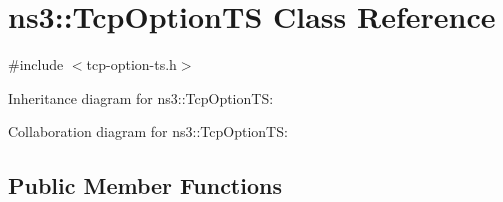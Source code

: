 \hypertarget{classns3_1_1TcpOptionTS}{}\section{ns3\+:\+:Tcp\+Option\+TS Class Reference}
\label{classns3_1_1TcpOptionTS}


{\ttfamily \#include $<$tcp-\/option-\/ts.\+h$>$}



Inheritance diagram for ns3\+:\+:Tcp\+Option\+TS\+:


Collaboration diagram for ns3\+:\+:Tcp\+Option\+TS\+:
\subsection*{Public Member Functions}
